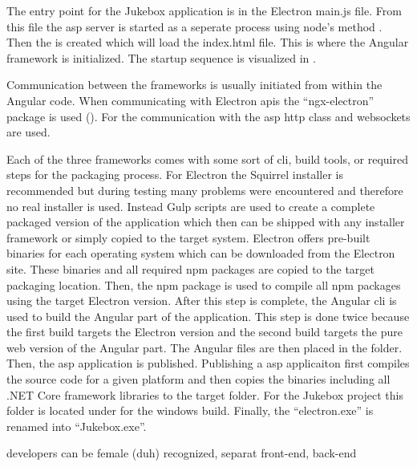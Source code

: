 
The entry point for the Jukebox application is in the Electron main.js file. From this file the \gls{asp} server is started as a seperate process using node's  method \cite{nodeSpawn}. Then the  is created which will load the index.html file. This is where the Angular framework is initialized. The startup sequence is visualized in .


Communication between the frameworks is usually initiated from within the Angular code. When communicating with Electron \glspl{api} the \enquote{ngx-electron} package is used (). For the communication with the \gls{asp} \gls{http} class and websockets are used.


Each of the three frameworks comes with some sort of \gls{cli}, build tools, or required steps for the packaging process. For Electron the Squirrel \cite{squirrel} installer is recommended but during testing many problems were encountered and therefore no real installer is used. Instead Gulp scripts \cite{gulp} are used to create a complete packaged version of the application which then can be shipped with any installer framework or simply copied to the target system. Electron offers pre-built binaries for each operating system which can be downloaded from the Electron site. These binaries and all required \gls{npm} packages are copied to the target packaging location. Then, the  \gls{npm} package is used to compile all \gls{npm} packages using the target Electron version. After this step is complete, the Angular \gls{cli} is used to build the Angular part of the application. This step is done twice because the first build targets the Electron version and the second build targets the pure web version of the Angular part. The Angular files are then placed in the  folder. Then, the \gls{asp} application is published. Publishing a \gls{asp} applicaiton first compiles the source code for a given platform and then copies the binaries including all .NET Core framework libraries to the target folder. For the Jukebox project this folder is located under  for the windows build. Finally, the \enquote{electron.exe} is renamed into \enquote{Jukebox.exe}.


developers can be female (duh)
recognized, separat
front-end, back-end
